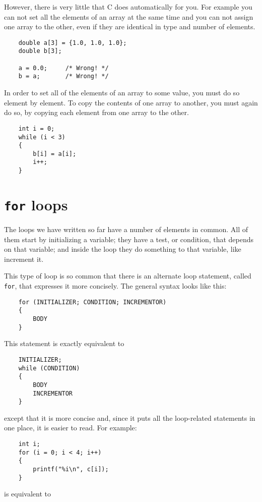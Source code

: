 However, there is very little that C does automatically for you. For example
you can not set all the elements of an array at the same time and you can not
assign one array to the other, even if they are identical in type and number of elements.


\begin{verbatim}
    double a[3] = {1.0, 1.0, 1.0};
    double b[3];

    a = 0.0;     /* Wrong! */
    b = a;       /* Wrong! */
\end{verbatim}
%

In order to set all of the elements of an array to some value, you must do so element by element.
To copy the contents of one array to another, you must again do so, by copying each element from
one array to the other.

\begin{verbatim}
    int i = 0;
    while (i < 3) 
    {
        b[i] = a[i];
        i++;
    }
\end{verbatim}

\section{{\tt for} loops}

The loops we have written so far have a number of elements
in common.  All of them start by initializing a variable;
they have a test, or condition, that depends on that variable;
and inside the loop they do something to that variable,
like increment it.


This type of loop is so common that there is an alternate
loop statement, called {\tt for}, that expresses it more
concisely.  The general syntax looks like this:

\begin{verbatim}
    for (INITIALIZER; CONDITION; INCREMENTOR) 
    {
        BODY
    }
\end{verbatim}
%
This statement is exactly equivalent to

\begin{verbatim}
    INITIALIZER;
    while (CONDITION) 
    {
        BODY
        INCREMENTOR
    }
\end{verbatim}
%
except that it is more concise and, since it puts all the
loop-related statements in one place, it is easier to read.
For example:

\begin{verbatim}
    int i;
    for (i = 0; i < 4; i++) 
    {
        printf("%i\n", c[i]);
    }
\end{verbatim}
%
is equivalent to 

